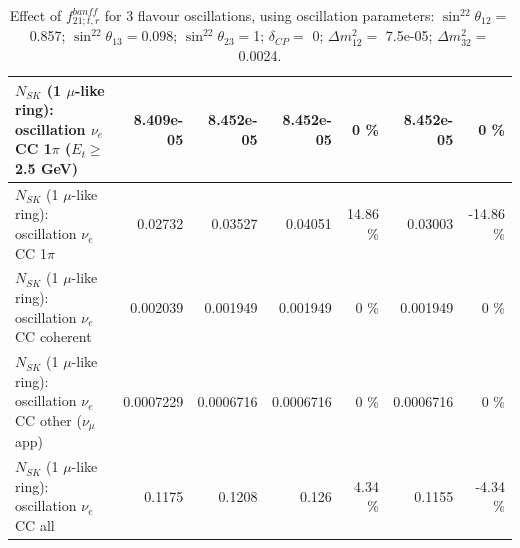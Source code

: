 \begin{table}
\begin{tabular}{| l | r | r | r  r | r  r |}
$N_{SK}$ (1 $\mu$-like ring): oscillation $\nu_e$ CC 1$\pi$ ($E_{t} \geq$ 2.5 GeV) &       8.409e-05 &       8.452e-05 &       8.452e-05 &        0 \%  &       8.452e-05 &        0 \%  \\ 
\hline
                     $N_{SK}$ (1 $\mu$-like ring): oscillation $\nu_e$ CC 1$\pi$ &         0.02732 &         0.03527 &         0.04051 &    14.86 \%  &         0.03003 &   -14.86 \%  \\ 
                   $N_{SK}$ (1 $\mu$-like ring): oscillation $\nu_e$ CC coherent &        0.002039 &        0.001949 &        0.001949 &        0 \%  &        0.001949 &        0 \%  \\ 
      $N_{SK}$ (1 $\mu$-like ring): oscillation $\nu_e$ CC other ($\nu_\mu$ app) &       0.0007229 &       0.0006716 &       0.0006716 &        0 \%  &       0.0006716 &        0 \%  \\ 
                       $N_{SK}$ (1 $\mu$-like ring): oscillation $\nu_e$  CC all &          0.1175 &          0.1208 &           0.126 &     4.34 \%  &          0.1155 &    -4.34 \%  \\ 
\hline
\hline
\end{tabular}
\caption{ Effect of $f_{21; t, r}^{banff}$ for 3 flavour oscillations, using oscillation parameters:  $\sin^22\theta_{12} = $0.857; $\sin^22\theta_{13} = $0.098; $\sin^22\theta_{23} = $1; $\delta_{CP} = $        0; $\Delta m^2_{12} = $    7.5e-05; $\Delta m^2_{32} = $    0.0024. }
\label{tab:num_banff_cc1piE0_1RmuT_3f_osc_t13:0.098}
\end{table}
\clearpage
